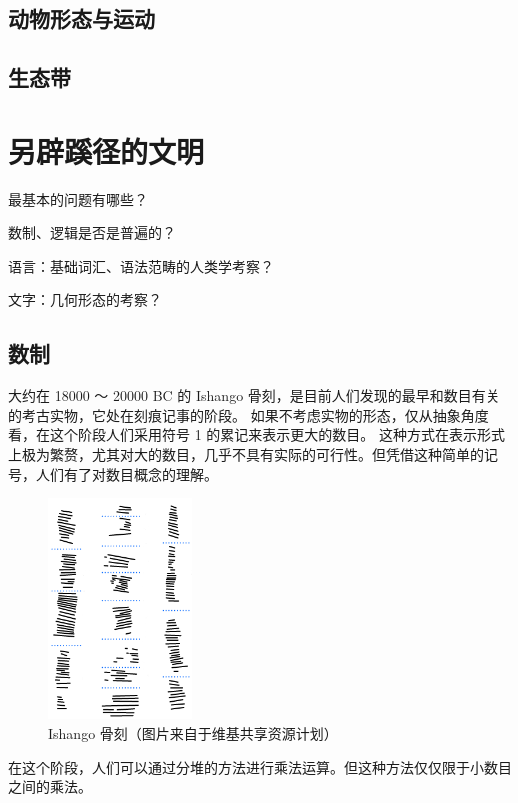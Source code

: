 \documentclass[a4paper,10.5pt]{book}
\begin{document}
\section{动物形态与运动}

\section{生态带}




\chapter{另辟蹊径的文明}

最基本的问题有哪些？

数制、逻辑是否是普遍的？

语言：基础词汇、语法范畴的人类学考察？

文字：几何形态的考察？

\section{数制}

大约在 18000 ～ 20000 BC 的 Ishango 骨刻，是目前人们发现的最早和数目有关的考古实物，它处在刻痕记事的阶段。
如果不考虑实物的形态，仅从抽象角度看，在这个阶段人们采用符号 1 的累记来表示更大的数目。
这种方式在表示形式上极为繁赘，尤其对大的数目，几乎不具有实际的可行性。但凭借这种简单的记号，人们有了对数目概念的理解。

\begin{figure}[ht]
\centering
\includegraphics[width=1.5in]{images/IshangoAllColumns.png}
\caption{Ishango 骨刻（图片来自于维基共享资源计划）}
\end{figure}

在这个阶段，人们可以通过分堆的方法进行乘法运算。但这种方法仅仅限于小数目之间的乘法。
\end{document}
